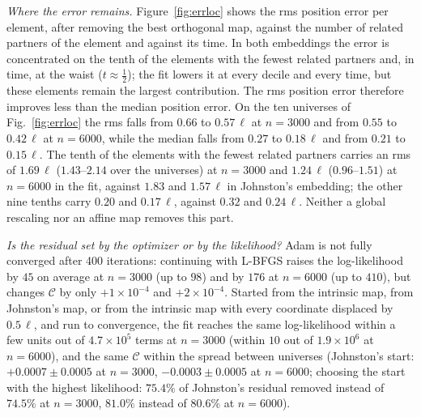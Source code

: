 \documentclass[prd,twocolumn,superscriptaddress,nofootinbib,amsmath,amssymb,floatfix]{revtex4-2}
\begin{document}
\emph{Where the error remains.} Figure~\ref{fig:errloc} shows the rms position error per element, after removing the best orthogonal map, against the number of related partners of the element and against its time. In both embeddings the error is concentrated on the tenth of the elements with the fewest related partners and, in time, at the waist ($t\approx\tfrac12$); the fit lowers it at every decile and every time, but these elements remain the largest contribution. The rms position error therefore improves less than the median position error. On the ten universes of Fig.~\ref{fig:errloc} the rms falls from $0.66$ to $0.57\,\ell$ at $n=3000$ and from $0.55$ to $0.42\,\ell$ at $n=6000$, while the median falls from $0.27$ to $0.18\,\ell$ and from $0.21$ to $0.15\,\ell$. The tenth of the elements with the fewest related partners carries an rms of $1.69\,\ell$ ($1.43$--$2.14$ over the universes) at $n=3000$ and $1.24\,\ell$ ($0.96$--$1.51$) at $n=6000$ in the fit, against $1.83$ and $1.57\,\ell$ in Johnston's embedding; the other nine tenths carry $0.20$ and $0.17\,\ell$, against $0.32$ and $0.24\,\ell$. Neither a global rescaling nor an affine map removes this part.

\emph{Is the residual set by the optimizer or by the likelihood?} Adam is not fully converged after 400 iterations: continuing with L-BFGS raises the log-likelihood by $45$ on average at $n=3000$ (up to $98$) and by $176$ at $n=6000$ (up to $410$), but changes $\mathcal C$ by only $+1\times10^{-4}$ and $+2\times10^{-4}$. Started from the intrinsic map, from Johnston's map, or from the intrinsic map with every coordinate displaced by $0.5\,\ell$, and run to convergence, the fit reaches the same log-likelihood within a few units out of $4.7\times10^5$ terms at $n=3000$ (within $10$ out of $1.9\times10^6$ at $n=6000$), and the same $\mathcal C$ within the spread between universes (Johnston's start: $+0.0007\pm0.0005$ at $n=3000$, $-0.0003\pm0.0005$ at $n=6000$; choosing the start with the highest likelihood: $75.4\%$ of Johnston's residual removed instead of $74.5\%$ at $n=3000$, $81.0\%$ instead of $80.6\%$ at $n=6000$).
\end{document}
